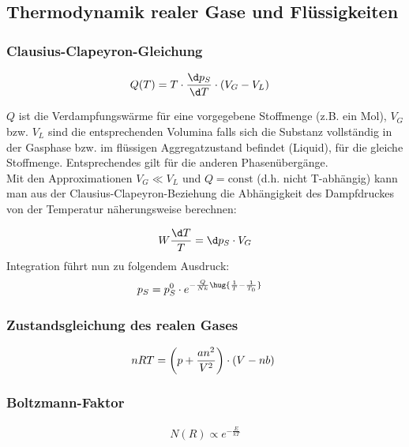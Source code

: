 \documentclass[twocolumn]{summery_3.1}
\begin{document}
\subsection{Thermodynamik realer Gase und Flüssigkeiten}
{
    \subsubsection{Clausius-Clapeyron-Gleichung}
    {
        \begin{align*}
            Q(T) &= T\cdot \frac{\d p_S}{\d T} \cdot (V_G - V_L)
        \end{align*}

        $Q$ ist die Verdampfungswärme für eine vorgegebene Stoffmenge (z.B. ein Mol), $V_G$
        bzw. $V_L$ sind die entsprechenden Volumina falls sich die Substanz vollständig in
        der Gasphase bzw. im flüssigen Aggregatzustand befindet (Liquid), für die gleiche
        Stoffmenge. Entsprechendes gilt für die anderen Phasenübergänge.\\

        Mit den Approximationen $V_G \ll V_L$ und $Q = \mathrm{const}$ (d.h. nicht T-abhängig) kann
        man aus der Clausius-Clapeyron-Beziehung die Abhängigkeit des Dampfdruckes
        von der Temperatur näherungsweise berechnen:

        \begin{align*}
            W \frac{\d T}{T} = \d p_S \cdot V_G
        \end{align*}
        Integration führt nun zu folgendem Ausdruck: 
        \begin{align*}
            p_S &= p_S^0 \cdot e ^{-\frac{Q}{Nk}\hug{\frac{1}{T}-\frac{1}{T_0}}}
        \end{align*}
    }
    \subsubsection{Zustandsgleichung des realen Gases}
    {
        \begin{equation*}
            n R T = \left(p+\frac{a n^2}{V^2}\right) \cdot(V-n b)\\\
        \end{equation*}
    }
    \subsubsection{Boltzmann-Faktor}
    {
        \begin{align*}
            N(R) \propto  e^{-\frac{E}{kT}}
        \end{align*}
    }
}
\end{document}
